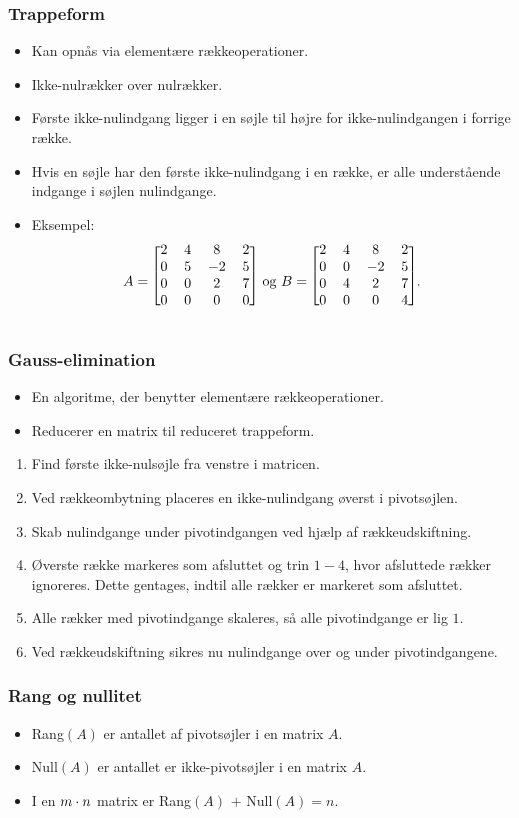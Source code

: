 \begin{frame}
\frametitle{Trappeform}
\begin{itemize}
\item Kan opnås via elementære rækkeoperationer. 
\item Ikke-nulrækker over nulrækker. 
\item Første ikke-nulindgang ligger i en søjle til højre for ikke-nulindgangen i forrige række. 
\item Hvis en søjle har den første ikke-nulindgang i en række, er alle understående indgange i søjlen nulindgange. 
\item Eksempel: 
\begin{align*}
A=
\begin{blockarray}{cccc}
\begin{block}{[cccc]}
2 & 4 & 8 & 2\\
0 & 5 & -2 & 5\\
0 & 0 & 2 & 7\\
0 & 0 & 0 & 0\\
\end{block}
\end{blockarray}
\text{ og }
B=
\begin{blockarray}{cccc}
\begin{block}{[cccc]}
2 & 4 & 8 & 2\\
0 & 0 & -2 & 5\\
0 & 4 & 2 & 7\\
0 & 0 & 0 & 4\\
\end{block}
\end{blockarray}.
\end{align*}
\end{itemize}
\end{frame}
\begin{frame}
\frametitle{Gauss-elimination}
\begin{itemize}
\item En algoritme, der benytter elementære rækkeoperationer. 
\item Reducerer en matrix til reduceret trappeform. 
\end{itemize}
\begin{enumerate}
\item Find første ikke-nulsøjle fra venstre i matricen.
\item Ved rækkeombytning placeres en ikke-nulindgang øverst i pivotsøjlen.
\item Skab nulindgange under pivotindgangen ved hjælp af rækkeudskiftning.
\item Øverste række markeres som afsluttet og trin $1-4$, hvor afsluttede rækker ignoreres.
Dette gentages, indtil alle rækker er markeret som afsluttet.
\item Alle rækker med pivotindgange skaleres, så alle pivotindgange er lig $1$.
\item Ved rækkeudskiftning sikres nu nulindgange over og under pivotindgangene.
\end{enumerate}
\end{frame}
\begin{frame}
\frametitle{Rang og nullitet}
\begin{itemize}
\item Rang$(A)$ er antallet af pivotsøjler i en matrix $A$. 
\item Null$(A)$ er antallet er ikke-pivotsøjler i en matrix $A$. 
\item I en $m \cross n$ matrix er Rang$(A)$ $+$ Null$(A) = n$. 
\end{itemize}
\end{frame}